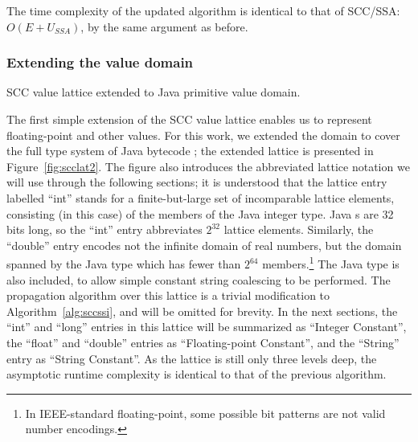 \documentclass[12pt,titlepage,twoside]{article}
\newcommand{\figscale}{1.0}
\begin{document}
The time complexity of the updated algorithm is identical to that of
SCC/SSA: $O(E+U_{SSA})$, by the same argument as before.

\subsubsection{Extending the value domain}
\begin{myfigure}
\centering\renewcommand{\figscale}{0.5}
\caption{SCC value lattice extended to Java primitive value domain.}
\label{fig:scclat2}
\end{myfigure}
The first simple extension of the SCC value lattice enables us to
represent floating-point and other values.  For this work, we extended
the domain to cover the full type system of Java bytecode
\cite{gosling95:bytecode}; the extended lattice is presented in
Figure~\ref{fig:scclat2}.
The figure also introduces the abbreviated lattice notation we will use
through the following sections; it is understood that the
lattice entry labelled ``int'' stands for a finite-but-large set of
incomparable lattice elements, consisting (in this case) of the
members of the Java  integer type.
Java s are 32 bits long, so the ``int'' entry abbreviates
$2^{32}$ lattice elements.  Similarly, the ``double'' entry encodes not
the infinite domain of real numbers, but the domain spanned by the
Java  type which has fewer than $2^{64}$
members.\footnote{In IEEE-standard floating-point, some possible bit
patterns are not valid number encodings.}  The
Java  type is also included, to allow simple constant
string coalescing to be performed.  The propagation algorithm over
this lattice is a trivial modification to Algorithm~\ref{alg:sccssi}, and
will be omitted for brevity.  In the next sections, the ``int'' and ``long''
entries in this lattice will be summarized as ``Integer Constant'',
the ``float'' and ``double'' entries as ``Floating-point Constant'',
and the ``String'' entry as ``String Constant''.  As the lattice is
still only three levels deep, the asymptotic runtime complexity is
identical to that of the previous algorithm.
\end{document}
